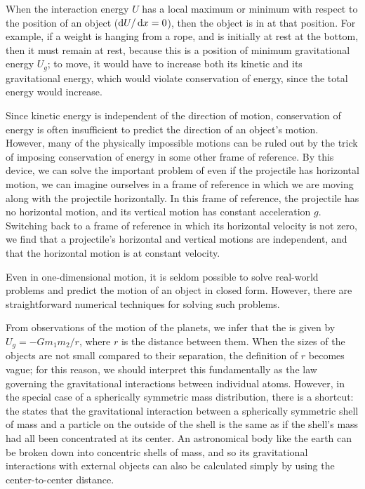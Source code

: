	When the interaction energy $U$ has a local maximum or minimum with respect
	to the position of an object ($\operatorname{d\!} U/\operatorname{d\!} x=0$), then the object is
	in  at that position. For example, if a weight is hanging
	from a rope, and is initially at rest at the bottom, then it must remain
	at rest, because this is a position of minimum gravitational energy $U_g$; to
	move, it would have to increase both its kinetic and its gravitational energy,
	which would violate conservation of energy, since the total energy would
	increase.
	
	Since kinetic energy is independent of the direction of motion, conservation
	of energy is often insufficient to predict the direction of an object's
	motion. However, many of the physically impossible motions can be ruled
	out by the trick of imposing conservation of energy in some other frame
	of reference. By this device, we can solve the important problem of
	\/ even if the projectile has horizontal motion,
	we can imagine ourselves in a frame of reference in which we are moving along with
	the projectile horizontally. In this frame of reference, the projectile has
	no horizontal motion, and its vertical motion has constant acceleration $g$.
	Switching back to a frame of reference in which its horizontal velocity is
	not zero, we find that a projectile's horizontal and vertical
	motions are independent, and that the horizontal motion is at constant velocity.
	
	Even in one-dimensional motion, it is seldom possible to solve real-world
	problems and predict the motion of an object in closed form. However, there
	are straightforward numerical techniques for solving such problems.
	
	From observations of the motion of the planets, we infer that the  is given by $U_g=-Gm_1m_2/r$, where $r$ is
	the distance between them. When the sizes of the objects are not small compared
	to their separation, the definition of $r$ becomes vague; for this reason,
	we should interpret this fundamentally as the law governing the gravitational
	interactions between individual atoms. However, in the special case of a spherically
	symmetric mass distribution, there is a shortcut: the 
	states that the gravitational interaction between a spherically symmetric shell
	of mass and a particle on the outside of the shell is the same as if the
	shell's mass had all been concentrated at its center. An astronomical body
	like the earth can be broken down into concentric shells of mass, and so its
	gravitational interactions with external objects can also be calculated simply
	by using the center-to-center distance.
	
